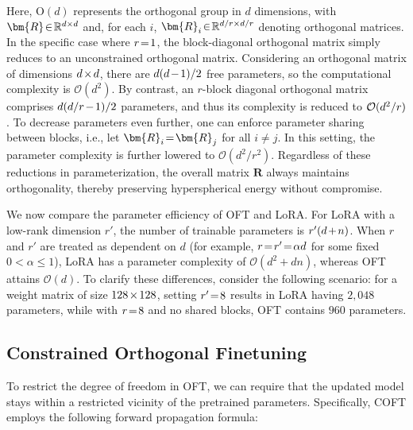 Here, $\text{O}(d)$ represents the orthogonal group in $d$ dimensions, with $\thickmuskip=2mu \medmuskip=2mu \bm{R}\in\mathbb{R}^{d\times d}$ and, for each $i$, $\thickmuskip=2mu \medmuskip=2mu \bm{R}_i\in\mathbb{R}^{d/r\times d/r}$ denoting orthogonal matrices. In the specific case where $\thickmuskip=2mu \medmuskip=2mu r=1$, the block-diagonal orthogonal matrix simply reduces to an unconstrained orthogonal matrix. Considering an orthogonal matrix of dimensions $\thickmuskip=2mu \medmuskip=2mu d\times d$, there are $\thickmuskip=2mu \medmuskip=2mu d(d-1)/2$ free parameters, so the computational complexity is $\mathcal{O}(d^2)$. By contrast, an $r$-block diagonal orthogonal matrix comprises $\thickmuskip=2mu \medmuskip=2mu d(d/r-1)/2$ parameters, and thus its complexity is reduced to $\thickmuskip=2mu \medmuskip=2mu \mathcal{O}(d^2/r)$. To decrease parameters even further, one can enforce parameter sharing between blocks, i.e., let $\thickmuskip=2mu \medmuskip=2mu\bm{R}_i=\bm{R}_j$ for all $i\neq j$. In this setting, the parameter complexity is further lowered to $\mathcal{O}(d^2/r^2)$. Regardless of these reductions in parameterization, the overall matrix $\bm{R}$ always maintains orthogonality, thereby preserving hyperspherical energy without compromise.

We now compare the parameter efficiency of OFT and LoRA. For LoRA with a low-rank dimension $r'$, the number of trainable parameters is $\thickmuskip=2mu \medmuskip=2mu r'(d+n)$. When $r$ and $r'$ are treated as dependent on $d$ (for example, $\thickmuskip=2mu \medmuskip=2mu r=r'=\alpha d$ for some fixed $0<\alpha\leq 1$), LoRA has a parameter complexity of $\mathcal{O}(d^2+dn)$, whereas OFT attains $\mathcal{O}(d)$. To clarify these differences, consider the following scenario: for a weight matrix of size $\thickmuskip=2mu \medmuskip=2mu 128\times 128$, setting $\thickmuskip=2mu \medmuskip=2mu r'=8$ results in LoRA having $2,048$ parameters, while with $\thickmuskip=2mu \medmuskip=2mu r=8$ and no shared blocks, OFT contains $960$ parameters.

\subsection{Constrained Orthogonal Finetuning}

To restrict the degree of freedom in OFT, we can require that the updated model stays within a restricted vicinity of the pretrained parameters. Specifically, COFT employs the following forward propagation formula:

